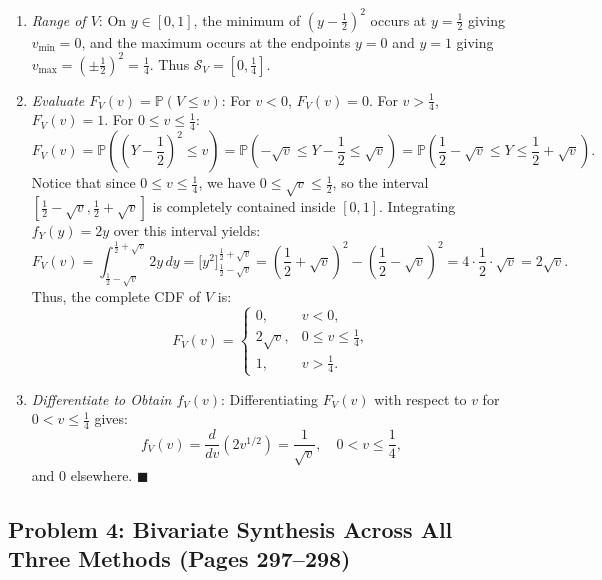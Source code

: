 \documentclass[11pt, letterpaper]{article}
\theoremstyle{definition}
\theoremstyle{remark}
\newcommand{\Prob}{\mathbb{P}}
\begin{document}
\begin{enumerate}[label=\textbf{Step \arabic*:}]
    \item \textit{Range of $V$}: On $y \in [0, 1]$, the minimum of $\left(y - \frac{1}{2}\right)^2$ occurs at $y = \frac{1}{2}$ giving $v_{\min} = 0$, and the maximum occurs at the endpoints $y = 0$ and $y = 1$ giving $v_{\max} = \left(\pm\frac{1}{2}\right)^2 = \frac{1}{4}$. Thus $\mathcal{S}_V = \left[0, \frac{1}{4}\right]$.
    
    \item \textit{Evaluate $F_V(v) = \Prob(V \le v)$}: For $v < 0$, $F_V(v) = 0$. For $v > \frac{1}{4}$, $F_V(v) = 1$. For $0 \le v \le \frac{1}{4}$:
    \[
        F_V(v) = \Prob\left(\left(Y - \frac{1}{2}\right)^2 \le v\right) = \Prob\left(-\sqrt{v} \le Y - \frac{1}{2} \le \sqrt{v}\right) = \Prob\left(\frac{1}{2} - \sqrt{v} \le Y \le \frac{1}{2} + \sqrt{v}\right).
    \]
    Notice that since $0 \le v \le \frac{1}{4}$, we have $0 \le \sqrt{v} \le \frac{1}{2}$, so the interval $\left[\frac{1}{2} - \sqrt{v}, \frac{1}{2} + \sqrt{v}\right]$ is completely contained inside $[0, 1]$. Integrating $f_Y(y) = 2y$ over this interval yields:
    \[
        F_V(v) = \int_{\frac{1}{2} - \sqrt{v}}^{\frac{1}{2} + \sqrt{v}} 2y \, dy = \Big[y^2\Big]_{\frac{1}{2} - \sqrt{v}}^{\frac{1}{2} + \sqrt{v}} = \left(\frac{1}{2} + \sqrt{v}\right)^2 - \left(\frac{1}{2} - \sqrt{v}\right)^2 = 4 \cdot \frac{1}{2} \cdot \sqrt{v} = 2\sqrt{v}.
    \]
    Thus, the complete CDF of $V$ is:
    \[
        F_V(v) = \begin{cases}
            0, & v < 0, \\[4pt]
            2\sqrt{v}, & 0 \le v \le \frac{1}{4}, \\[4pt]
            1, & v > \frac{1}{4}.
        \end{cases}
    \]
    
    \item \textit{Differentiate to Obtain $f_V(v)$}: Differentiating $F_V(v)$ with respect to $v$ for $0 < v \le \frac{1}{4}$ gives:
    \[
        f_V(v) = \frac{d}{dv}\left(2v^{1/2}\right) = \frac{1}{\sqrt{v}}, \quad 0 < v \le \frac{1}{4},
    \]
    and $0$ elsewhere. \hfill $\blacksquare$
\end{enumerate}

\subsection{Problem 4: Bivariate Synthesis Across All Three Methods (Pages 297--298)}
\end{document}
